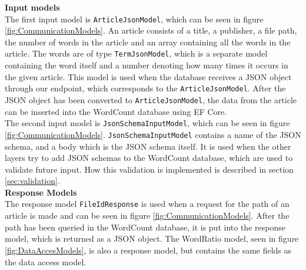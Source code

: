 \noindent\textbf{Input models}\\
The first input model is \texttt{ArticleJsonModel}, which can be seen in figure \ref{fig:CommunicationModels}. An article consists of a title, a publisher, a file path, the number of words in the article and an array containing all the words in the article. 
The words are of type \texttt{TermJsonModel}, which is a separate model containing the word itself and a number denoting how many times it occurs in the given article.
This model is used when the database receives a JSON object through our endpoint, which corresponds to the \texttt{ArticleJsonModel}. 
After the JSON object has been converted to \texttt{ArticleJsonModel}, the data from the article can be inserted into the WordCount database using EF Core.
\\
The second input model is \texttt{JsonSchemaInputModel}, which can be seen in figure \ref*{fig:CommunicationModels}. \texttt{JsonSchemaInputModel} contains a name of the JSON schema, and a body which is the JSON schema itself. 
It is used when the other layers try to add JSON schemas to the WordCount database, which are used to validate future input. 
How this validation is implemented is described in section \ref*{sec:validation}.
\\
\noindent\textbf{Response Models}\\
The response model \texttt{FileIdResponse} is used when a request for the path of an article is made and can be seen in figure \ref*{fig:CommunicationModels}.
After the path has been queried in the WordCount database, it is put into the response model, which is returned as a JSON object. The WordRatio model, seen in figure \ref{fig:DataAccesModels}, is also a response model, but contains the same fields as the data access model.

